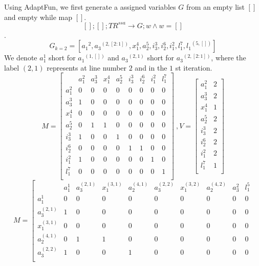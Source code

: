 \documentclass[a4paper,11pt]{article}
\newcommand{\THESYSTEM}{\textsf{AdaptFun}}
\begin{document}
\begin{example}
{
Using \THESYSTEM, we first generate a assigned variables $G$ from an empty list $[]$ and empty while map $[]$.
 \[[]; []; TR^{ssa} \to G; w  \land w = []\].
 \[G_{k=2} = \left[
  {a_1}^2 , {a_3}^{(2,[2:1])} , x_1^{4} , a_2^{5} ,  i_3^{3} , 
  i_2^{6}, i_1^{2} , l_1^{7} , {l_1}^{(5, [])}   \right] \]
  We denote $a_1^{1}$ short for ${a_1}^{(1, [])}$ and ${a_3}^{(2,1)}$ short for ${a_3}^{(2,[2:1])}$, where the label $(2, 1)$ represents at line number $2$ and in the $1$ st iteration.
  } 
\[
{
M =  \left[ \begin{matrix}
 & a_1^{2} & a_3^{3} & x_1^{4} 
 & a_2^{5}  & i_3^{3} & i_2^{6} & i_1^{2} & l_1^{7}\\
a_1^{2} & 0 & 0 & 0 & 0 & 0 & 0 & 0 & 0  \\
a_3^{3} & 1 & 0 & 0 & 0 & 0 & 0 & 0 & 0 \\
x_1^{4} & 0 & 0 & 0 & 0 & 0 & 0 & 0 & 0 \\
a_2^{5} & 0 & 1 & 1 & 0 & 0 & 0 & 0 & 0 \\
i_3^{3} & 1 & 0 & 0 & 1 & 0 & 0 & 0 & 0 \\
i_2^{6} & 0 & 0 & 0 & 0 & 1 & 1 & 0 & 0 \\
i_1^{2} & 1 & 0 & 0 & 0 & 0 & 0 & 1 & 0 \\
l_1^{7} & 0 & 0 & 0 & 0 & 0 & 0 & 0 & 1 \\
 \end{matrix} \right] 
~ , V = \left [ \begin{matrix}
a_1^{2} & 2   \\
a_3^{3} & 2  \\
x_1^{4} & 1  \\
a_2^{5} & 2  \\
i_3^{3} & 2  \\
i_2^{6} & 2  \\
i_1^{2} & 2  \\
l_1^{7} & 1 \\
\end{matrix} \right ]
}
\]
\[
{
M =  \left[ \begin{matrix}
 & a_1^{1} & a_3^{(2,1)} & x_1^{(3,1)} & a_2^{(4,1)}  & a_3^{(2,2)} & x_1^{(3,2)} & a_2^{(4,2)} & a_3^{2} & l_1^{5}\\
 a_1^{1} & 0 & 0 & 0 & 0 & 0 & 0 & 0 &0 &0 \\
a_3^{(2,1)} & 1 & 0 & 0 & 0 & 0 & 0 & 0&0&0\\
x_1^{(3,1)} & 0 & 0 & 0 & 0 & 0 & 0& 0& 0 &0\\
a_2^{(4,1)} & 0 & 1 & 1 & 0 & 0 & 0 & 0& 0&0\\
a_3^{(2,2)} & 1 & 0 & 0 & 1 & 0 & 0 & 0 & 0&0 \\

\end{matrix}}\]
\end{example}
\end{document}
